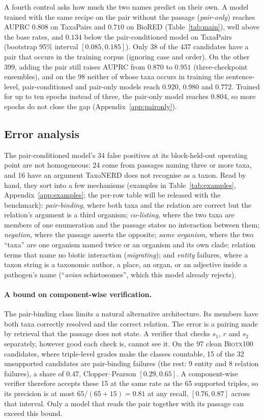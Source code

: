 \documentclass[11pt]{article}
\newcommand{\bench}{\mbox{TaxaPairs}}
\begin{document}
A fourth control asks how much the two names predict on their own. A model trained with the same recipe on
the pair without the passage (\emph{pair-only}) reaches AUPRC $0.808$ on \bench{} and $0.710$ on
BioRED (Table~\ref{tab:main}), well above the base rates, and $0.134$ below the pair-conditioned
model on \bench{} (bootstrap 95\% interval $[0.085, 0.185]$). Only 38 of the 437 candidates have a
pair that occurs in the training corpus (ignoring case and order). On the other 399, adding the pair still raises
AUPRC from $0.870$ to $0.951$ (three-checkpoint ensembles), and on the 98 neither of whose taxa occurs
in training the sentence-level, pair-conditioned and pair-only models reach $0.920$, $0.980$ and $0.772$. Trained for up to ten epochs instead of
three, the pair-only model reaches $0.804$, so more epochs do not close the gap (Appendix~\ref{app:paironly}).

\subsection{Error analysis}
\label{sec:errors}
\label{sec:decomp}

The pair-conditioned model's 34 false positives at its block-held-out operating point are not
homogeneous: 24 come from passages naming three or more taxa, and 16 have an argument TaxoNERD does
not recognise as a taxon. Read by hand, they sort into a few mechanisms (examples in
Table~\ref{tab:examples}, Appendix~\ref{app:examples}; the per-row table will be released with the benchmark):
\emph{pair-binding}, where both taxa and the relation are correct but the relation's argument is a
third organism; \emph{co-listing}, where the two taxa are members of one enumeration and the passage
states no interaction between them; \emph{negation}, where the passage asserts the
opposite; \emph{same organism}, where the two ``taxa'' are one organism named twice or an organism
and its own clade; relation terms that name no biotic interaction
(\emph{migrating}); and \emph{entity} failures, where a
taxon string is a taxonomic author, a place, an organ, or an adjective inside a pathogen's name
(``\emph{avian} schistosomes'', which this model already rejects).

\paragraph{A bound on component-wise verification.}
The pair-binding class limits a natural alternative architecture. Its members have both taxa
correctly resolved and the correct relation. The error is a pairing made by retrieval that the passage does not state. A verifier
that checks $s_1$, $r$ and $s_2$ separately, however good each check is, cannot see it. On the 97
clean \textsc{Biotx100} candidates, where triple-level grades make the classes countable, 15 of the
32 unsupported candidates are pair-binding failures (the rest: 9 entity and 8 relation failures), a share of
$0.47$, Clopper--Pearson $[0.29, 0.65]$. A component-wise verifier therefore accepts these 15 at the same rate as the
65 supported triples, so its precision is at most
$65/(65+15) = 0.81$ at any recall, $[0.76, 0.87]$ across that interval. Only a model that reads the pair together with its passage can exceed this bound.
\end{document}
